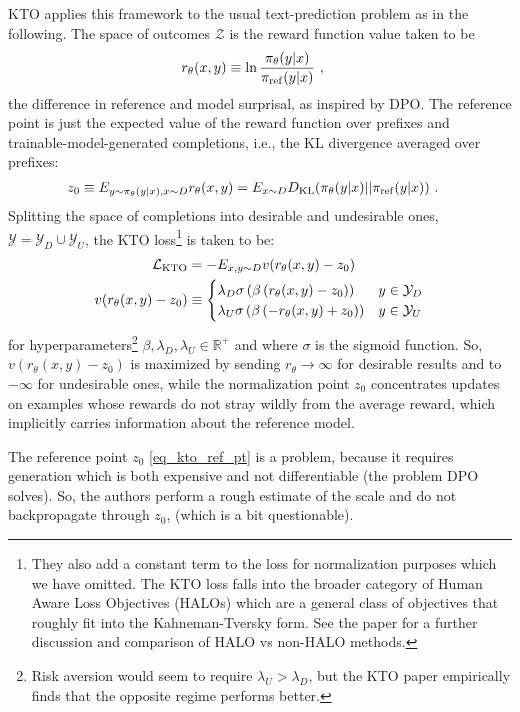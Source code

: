 KTO applies this framework to the usual text-prediction problem as in the following. The space of
outcomes $ \mathcal{Z} $ is the reward function value taken to be
\begin{align}
    r _{ \theta  }(x, y)&\equiv \ln \frac{ \pi _{ \theta  }(y|x) }{ \pi _{ {\rm ref}}(y|x) } \ , \label{eq_kto_reward}
\end{align}
the difference in reference and model surprisal, as inspired by DPO. The reference point is just the
expected value of the reward function over prefixes and trainable-model-generated completions, i.e.,
the KL divergence averaged over prefixes:
\begin{align}
   z _{ 0 }  & \equiv  E _{ y \sim \pi _{ \theta  }(y|x)  ,   x \sim D  }r _{ \theta  }(x, y) =E _{ x \sim D  } D _{ {\rm KL} }(\pi _{ \theta  }(y|x)|| \pi _{ {\rm ref} }(y|x)) \ . \label{eq_kto_ref_pt}
\end{align}
Splitting the space of completions into desirable and undesirable ones,  $ \mathcal{Y}=
\mathcal{Y}_{ D }\cup \mathcal{Y}_{ U } $, the KTO loss\footnote{They also add a constant term to
    the loss for normalization purposes which we have omitted. The KTO loss falls into the broader
    category of Human Aware Loss Objectives (HALOs) which are a general class of objectives that
    roughly fit into the Kahneman-Tversky form. See the paper for a further discussion and
    comparison of HALO vs non-HALO methods.
} is taken to be:
\begin{align}
    \mathcal{L}_{ {\rm KTO} } &= - E _{ x, y \sim D }v(r _{ \theta  }(x, y) - z _{ 0 })\nonumber\\
    v(r _{ \theta  }(x, y)-z _{ 0 })&\equiv  \begin{cases}
        \lambda _{ D }\sigma \left ( \beta \left ( r _{ \theta  }(x, y) - z _{ 0 } \right ) \right ) & y \in \mathcal{Y}_{ D }\nonumber\\
        \lambda _{ U }\sigma \left ( \beta \left ( -r _{ \theta  }(x, y) + z _{ 0 } \right ) \right ) & y \in \mathcal{Y}_{ U } \label{eq_kto_loss}
    \end{cases}
\end{align}
for hyperparameters\footnote{Risk aversion would seem to require $ \lambda _{ U }> \lambda _{ D }$,
but the KTO paper empirically finds that the opposite regime performs better.} $ \beta , \lambda _{ D }, \lambda _{ U } \in
\mathbb{R} ^{ + } $ and where $ \sigma  $ is the sigmoid function. So,  $ v(r _{ \theta  }(x,
y)-z _{ 0 }) $ is maximized by sending $ r _{ \theta   } \longrightarrow  \infty $ for desirable
results and to $ -\infty $ for undesirable ones, while the normalization point $ z _{ 0 } $
concentrates updates on examples whose rewards do not stray wildly from the average reward, which
implicitly carries information about the reference model.

The reference point $ z _{ 0 } $ \eqref{eq_kto_ref_pt} is a problem, because it requires generation
which is both expensive and not differentiable (the problem DPO solves). So, the authors perform a
rough estimate of the scale and do not backpropagate through $ z _{ 0 } $, (which is a bit
questionable).

